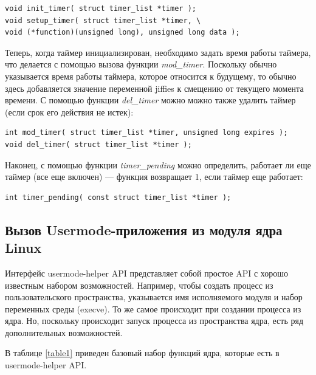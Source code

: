\documentclass[a4paper,14pt]{extarticle}
\begin{document}
 	\begin{verbatim}
void init_timer( struct timer_list *timer );
void setup_timer( struct timer_list *timer, \
void (*function)(unsigned long), unsigned long data );
 	\end{verbatim}
 	
 	Теперь, когда таймер инициализирован, необходимо задать время работы таймера, что делается с помощью вызова функции \textit{mod\_timer}. Поскольку обычно указывается время работы таймера, которое относится к будущему, то обычно здесь добавляется значение переменной jiffies к смещению от текущего момента времени. С помощью функции \textit{del\_timer} можно можно также удалить таймер (если срок его действия не истек):
 	
 	\begin{verbatim}
int mod_timer( struct timer_list *timer, unsigned long expires );
void del_timer( struct timer_list *timer );
 	\end{verbatim}
 	
 	Наконец, с помощью функции \textit{timer\_pending} можно определить, работает ли еще таймер (все еще включен) — функция возвращает 1, если таймер еще работает:
 	
 	\begin{verbatim}
int timer_pending( const struct timer_list *timer );
 	\end{verbatim}
 	
 	\subsection{Вызов Usermode-приложения из модуля ядра Linux}
 	
 	Интерфейс usermode-helper API представляет собой простое API с хорошо известным набором возможностей. Например, чтобы создать процесс из пользовательского пространства, указывается имя исполняемого модуля и набор переменных среды (execve). То же самое происходит при создании процесса из ядра. Но, поскольку происходит запуск процесса из пространства ядра, есть ряд дополнительных возможностей.
 	
 	\newpage
 	
 	В таблице \ref{table1} приведен базовый набор функций ядра, которые есть в usermode-helper API.
 	
\end{document}
